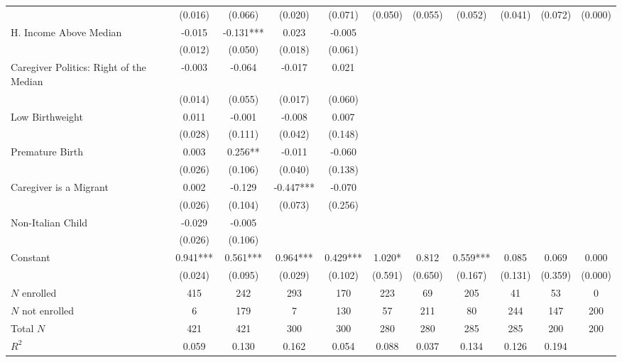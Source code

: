 \begin{tabular}{lcccccccccc}
 & (0.016) & (0.066) & (0.020) & (0.071) & (0.050) & (0.055) & (0.052) & (0.041) & (0.072) & (0.000) \\
H. Income Above Median & -0.015 & -0.131*** & 0.023 & -0.005 &  &  &  &  &  &  \\
 & (0.012) & (0.050) & (0.018) & (0.061) &  &  &  &  &  &  \\
Caregiver Politics: Right of the Median & -0.003 & -0.064 & -0.017 & 0.021 &  &  &  &  &  &  \\
 & (0.014) & (0.055) & (0.017) & (0.060) &  &  &  &  &  &  \\
Low Birthweight & 0.011 & -0.001 & -0.008 & 0.007 &  &  &  &  &  &  \\
 & (0.028) & (0.111) & (0.042) & (0.148) &  &  &  &  &  &  \\
Premature Birth & 0.003 & 0.256** & -0.011 & -0.060 &  &  &  &  &  &  \\
 & (0.026) & (0.106) & (0.040) & (0.138) &  &  &  &  &  &  \\
Caregiver is a Migrant & 0.002 & -0.129 & -0.447*** & -0.070 &  &  &  &  &  &  \\
 & (0.026) & (0.104) & (0.073) & (0.256) &  &  &  &  &  &  \\
Non-Italian Child & -0.029 & -0.005 &  &  &  &  &  &  &  &  \\
 & (0.026) & (0.106) &  &  &  &  &  &  &  &  \\
Constant & 0.941*** & 0.561*** & 0.964*** & 0.429*** & 1.020* & 0.812 & 0.559*** & 0.085 & 0.069 & 0.000 \\
 & (0.024) & (0.095) & (0.029) & (0.102) & (0.591) & (0.650) & (0.167) & (0.131) & (0.359) & (0.000) \\
\midrule
$N$ enrolled & 415 & 242 & 293 & 170 & 223 & 69 & 205 & 41 & 53 & 0 \\
$N$ not enrolled & 6 & 179 & 7 & 130 & 57 & 211 & 80 & 244 & 147 & 200 \\
Total $N$ & 421 & 421 & 300 & 300 & 280 & 280 & 285 & 285 & 200 & 200 \\$R^2$ & 0.059 & 0.130 & 0.162 & 0.054 & 0.088 & 0.037 & 0.134 & 0.126 & 0.194 &  \\ \bottomrule
\end{tabular}
